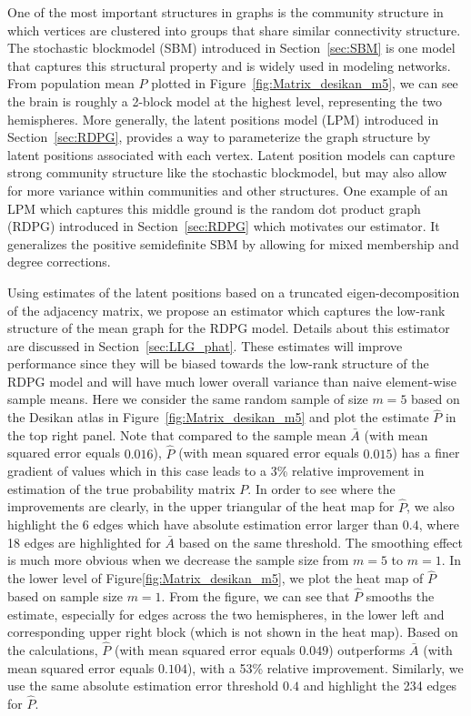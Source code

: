 One of the most important structures in graphs is the community structure in which vertices are clustered into groups that share similar connectivity structure. The stochastic blockmodel (SBM) \citep{holland1983stochastic} introduced in Section~\ref{sec:SBM} is one model that captures this structural property and is widely used in modeling networks. From population mean $P$ plotted in Figure~\ref{fig:Matrix_desikan_m5}, we can see the brain is roughly a 2-block model at the highest level, representing the two hemispheres.
More generally, the latent positions model (LPM) \citep{hoff2002latent} introduced in Section~\ref{sec:RDPG}, provides a way to parameterize the graph structure by latent positions associated with each vertex. 
Latent position models can capture strong community structure like the stochastic blockmodel, but may also allow for more variance within communities and other structures.
One example of an LPM which captures this middle ground is the random dot product graph (RDPG) \citep{young2007random, nickel2008random} introduced in Section~\ref{sec:RDPG} which motivates our estimator. It generalizes the positive semidefinite SBM by allowing for mixed membership and degree corrections.

Using estimates of the latent positions based on a truncated eigen-decomposition of the adjacency matrix, we propose an estimator which captures the low-rank structure of the mean graph for the RDPG model. Details about this estimator are discussed in Section~\ref{sec:LLG_phat}.
These estimates will improve performance since they will be biased towards the low-rank structure of the RDPG model and will have much lower overall variance than naive element-wise sample means. Here we consider the same random sample of size $m=5$ based on the Desikan atlas in Figure~\ref{fig:Matrix_desikan_m5} and plot the estimate $\hat{P}$ in the top right panel. Note that compared to the sample mean $\bar{A}$ (with mean squared error equals $0.016$), $\hat{P}$ (with mean squared error equals $0.015$) has a finer gradient of values which in this case leads to a 3\% relative improvement in estimation of the true probability matrix $P$. In order to see where the improvements are clearly, in the upper triangular of the heat map for $\hat{P}$, we also highlight the 6 edges which have absolute estimation error larger than $0.4$, where 18 edges are highlighted for $\bar{A}$ based on the same threshold. 
The smoothing effect is much more obvious when we decrease the sample size from $m = 5$ to $m = 1$. In the lower level of Figure\ref{fig:Matrix_desikan_m5}, we plot the heat map of $\hat{P}$ based on sample size $m = 1$. From the figure, we can see that $\hat{P}$ smooths the estimate, especially for edges across the two hemispheres, in the lower left and corresponding upper right block (which is not shown in the heat map). Based on the calculations, $\hat{P}$ (with mean squared error equals $0.049$) outperforms $\bar{A}$ (with mean squared error equals $0.104$), with a 53\% relative improvement. Similarly, we use the same absolute estimation error threshold $0.4$ and highlight the 234 edges for $\hat{P}$.


